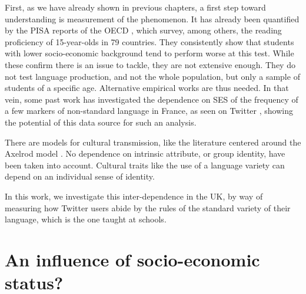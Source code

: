 \documentclass[../thesis.tex]{subfiles}
\begin{document}
First, as we have already shown in previous chapters, a first step toward understanding
is measurement of the phenomenon. It has already been quantified by the PISA reports of
the OECD \cite{OECDWhereAll2019}, which survey, among others, the reading proficiency of
15-year-olds in 79 countries. They consistently show that students with lower
socio-economic background tend to perform worse at this test. While these confirm there
is an issue to tackle, they are not extensive enough. They do not test language
production, and not the whole population, but only a sample of students of a specific
age. Alternative empirical works are thus needed.
In that vein, some past work has investigated the dependence on \ac{SES} of the
frequency of a few markers of non-standard language in France, as seen on Twitter
\cite{AbitbolSocioeconomicDependencies2018}, showing the potential of this data source
for such an analysis.

There are models for cultural transmission, like the literature centered around the
Axelrod model
\cite{AxelrodDisseminationCulture1997,CastellanoNonequilibriumPhase2000,KlemmGlobalCulture2003,KlemmNonequilibriumTransitions2003,BattistonLayeredSocial2017}.
No dependence on intrinsic attribute, or group identity, have been taken into account.
Cultural traits like the use of a language variety can depend on an individual sense of
identity.


In this work, we investigate this inter-dependence in the UK, by way of measuring how Twitter users abide by the rules of the standard variety of their language, which is the one taught at schools.



\section{An influence of socio-economic status?}
\end{document}
